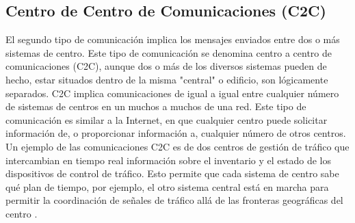 \subsection{Centro de Centro de Comunicaciones (C2C)}
El segundo tipo de comunicación implica los mensajes enviados entre dos o más sistemas de centro. Este tipo de comunicación se denomina centro a centro de comunicaciones (C2C), aunque dos o más de los diversos sistemas pueden de hecho, estar situados dentro de la misma "central" o edificio, son lógicamente separados. C2C implica comunicaciones de igual a igual entre cualquier número de sistemas de centros en un muchos a muchos de una red. Este tipo de comunicación es similar a la Internet, en que cualquier centro puede solicitar información de, o proporcionar información a, cualquier número de otros centros. Un ejemplo de las comunicaciones C2C es de dos centros de gestión de tráfico que intercambian en tiempo real información sobre el inventario y el estado de los dispositivos de control de tráfico. Esto permite que cada sistema de centro sabe qué plan de tiempo, por ejemplo, el otro sistema central está en marcha para permitir la coordinación de señales de tráfico allá de las fronteras geográficas del centro \cite{16}.

